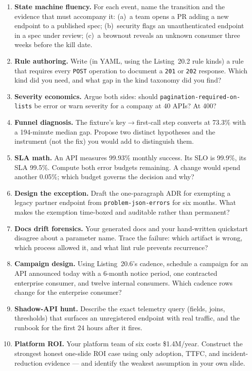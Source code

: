 \begin{enumerate}
  \item \textbf{State machine fluency.} For each event, name the
        transition and the evidence that must accompany it: (a)~a team
        opens a PR adding a new endpoint to a published spec;
        (b)~security flags an unauthenticated endpoint in a spec under
        review; (c)~a brownout reveals an unknown consumer three weeks
        before the kill date.
  \item \textbf{Rule authoring.} Write (in YAML, using the Listing~20.2
        rule kinds) a rule that requires every \texttt{POST} operation to
        document a \texttt{201} or \texttt{202} response. Which kind did
        you need, and what gap in the kind taxonomy did you find?
  \item \textbf{Severity economics.} Argue both sides: should
        \texttt{pagination-required-on-lists} be error or warn severity
        for a company at 40 APIs? At 400?
  \item \textbf{Funnel diagnosis.} The fixture's key$\rightarrow$first-call
        step converts at 73.3\% with a 194-minute median gap. Propose two
        distinct hypotheses and the instrument (not the fix) you would add
        to distinguish them.
  \item \textbf{SLA math.} An API measures 99.93\% monthly success. Its
        SLO is 99.9\%, its SLA 99.5\%. Compute both error budgets
        remaining. A change would spend another 0.05\%; which budget
        governs the decision and why?
  \item \textbf{Design the exception.} Draft the one-paragraph ADR for
        exempting a legacy partner endpoint from
        \texttt{problem-json-errors} for six months. What makes the
        exemption time-boxed and auditable rather than permanent?
  \item \textbf{Docs drift forensics.} Your generated docs and your
        hand-written quickstart disagree about a parameter name. Trace
        the failure: which artifact is wrong, which process allowed it,
        and what lint rule prevents recurrence?
  \item \textbf{Campaign design.} Using Listing~20.6's cadence, schedule
        a campaign for an API announced today with a 6-month notice
        period, one contracted enterprise consumer, and twelve internal
        consumers. Which cadence rows change for the enterprise consumer?
  \item \textbf{Shadow-API hunt.} Describe the exact telemetry query
        (fields, joins, thresholds) that surfaces an unregistered
        endpoint with real traffic, and the runbook for the first 24
        hours after it fires.
  \item \textbf{Platform ROI.} Your platform team of six costs \$1.4M/year.
        Construct the strongest honest one-slide ROI case using only
        adoption, TTFC, and incident-reduction evidence --- and identify
        the weakest assumption in your own slide.
\end{enumerate}

